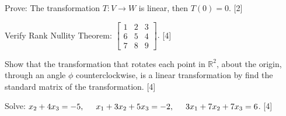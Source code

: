 \documentclass[12pt]{exam}
\begin{document}
\begin{questions}
  \setcounter{question}{3}
\question Prove: The transformation $T: V \to W$ is linear, then $T(0)=0$. [2]

  \question Verify Rank Nullity Theorem: $\displaystyle \begin{bmatrix}
    1 & 2 & 3 \\
    6 & 5 &4 \\
    7 & 8 & 9
\end{bmatrix}.$ [4]

\question Show that the transformation that rotates each point in $\mathbb{R}^2$, about the origin, through an angle $\phi$ counterclockwise, is a linear transformation by find the standard matrix of the transformation. [4]

\question Solve: \hspace{2mm} $x_2+4x_3 = -5, \hspace{5mm} x_1+3x_2+5x_3 = -2, \hspace{5mm} 3x_1 + 7x_2 + 7x_3 = 6$. [4]
\end{questions}
\end{document}
